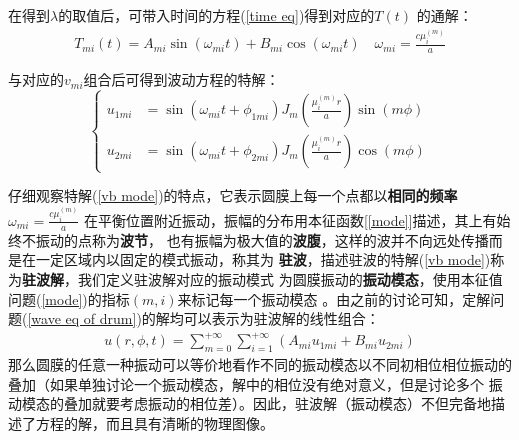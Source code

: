 \documentclass[a4paper]{ctexart}
\begin{document}
	\par 
	在得到$\lambda$的取值后，可带入时间的方程(\ref{time eq})得到对应的$T(t)$
	的通解：
	\begin{align}
		T_{mi}(t) = A_{mi}\sin(\omega_{mi}t) + B_{mi}\cos(\omega_{mi}t)\quad \omega_{mi} = \frac{c\mu_{i}^{(m)}}{a}
	\end{align}
	\par 
	\par 与对应的$v_{mi}$组合后可得到波动方程的特解：
	\begin{equation}
		\left\{
			\begin{split}
				u_{1mi} &= \sin(\omega_{mi}t + \phi_{1mi}) 
				J_m\left(\frac{\mu_{i}^{(m)}r}{a}\right)\sin(m\phi)\\
				u_{2mi} &= \sin(\omega_{mi}t + \phi_{2mi})
				J_m\left(\frac{\mu_{i}^{(m)}r}{a}\right)\cos(m\phi)
			\end{split}
		\right.
		\label{vb mode}
	\end{equation}
	\par 
	仔细观察特解(\ref{vb mode})的特点，它表示圆膜上每一个点都以\textbf{相同的频率}$\omega_{mi} = \frac{c\mu_{i}^{(m)}}{a}$
	在平衡位置附近振动，振幅的分布用本征函数[\ref{mode}]描述，其上有始终不振动的点称为\textbf{波节}，
	也有振幅为极大值的\textbf{波腹}，这样的波并不向远处传播而是在一定区域内以固定的模式振动，称其为
	\textbf{驻波}，描述驻波的特解(\ref{vb mode})称为\textbf{驻波解}，我们定义驻波解对应的振动模式
	为圆膜振动的\textbf{振动模态}，使用本征值问题(\ref{mode})的指标$(m, i)$来标记每一个振动模态
	。由之前的讨论可知，定解问题(\ref{wave eq of drum})的解均可以表示为驻波解的线性组合：
	\begin{align}
		u(r, \phi, t) = \sum_{m=0}^{+\infty}\sum_{i=1}^{+\infty}(A_{mi}u_{1mi} + B_{mi}u_{2mi})
	\end{align}
	那么圆膜的任意一种振动可以等价地看作不同的振动模态以不同初相位相位振动的叠加（如果单独讨论一个振动模态，解中的相位没有绝对意义，但是讨论多个
	振动模态的叠加就要考虑振动的相位差）。因此，驻波解（振动模态）不但完备地描述了方程的解，而且具有清晰的物理图像。
\end{document}
